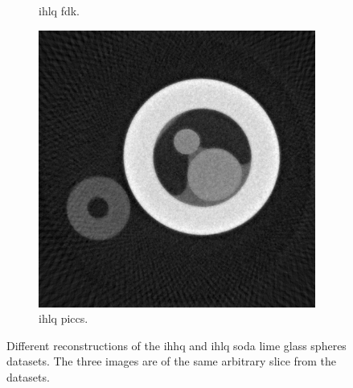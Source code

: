 \begin{figure}
\begin{subfigure}[t]{.3\textwidth}
      \caption{\gls{ihlq} \gls{fdk}.}
    \end{subfigure}
    \hfill  
    \begin{subfigure}[t]{.3\textwidth}
      \centering
      \includegraphics[width=\linewidth]{figures/kimrobertPICCS.png}
      \caption{\gls{ihlq} \gls{piccs}. }
    \end{subfigure}
    \caption[Different reconstructions of the IHHQ and IHLQ soda lime glass spheres dataset]{Different reconstructions of the \gls{ihhq} and \gls{ihlq} soda lime glass spheres datasets. The three images are of the same arbitrary slice from the datasets. }
    \label{fig:kimrobertdatasets}
\end{figure}

